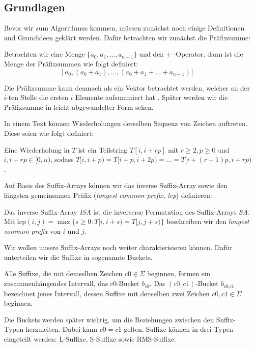 \subsection{Grundlagen}
Bevor wir zum Algorithmus kommen, müssen zunächst noch einige Definitionen und Grundideen geklärt werden. Dafür betrachten wir zunächst die Präfixsumme:

\begin{definition}
	Betrachten wir eine Menge $\{a_0, a_1, \dots , a_{n-1}\}$ und den \glqq + \grqq -Operator, dann ist die Menge der Präfixsummen wie folgt definiert:
	$$
	[a_0, (a_0 + a_1), \dots , (a_0 + a_1 + \dots + a_{n-1})]
	$$
\end{definition}
Die Präfixsumme kann demnach als ein Vektor betrachtet werden, welcher an der $i$-ten Stelle die ersten $i$ Elemente aufsummiert hat \cite{Blelloch90}. Später werden wir die Präfixsumme in leicht abgewandelter Form sehen.

In einem Text können Wiederholungen derselben Sequenz von Zeichen auftreten. Diese seien wie folgt definiert:
\begin{definition}
	\label{repetition}
	Eine Wiederholung in $T$ ist ein Teilstring $T[i, i + rp]$ mit $ r \geq 2, p \geq 0$ und $i, i + rp \in [0, n)$, sodass $T[i, i+p) = T[i + p, i + 2p) = \dots = T[i + (r-1)p, i + rp)$.
\end{definition}


Auf Basis des Suffix-Arrays können wir das inverse Suffix-Array sowie den längsten gemeinsamen Präfix (\textit{longest common prefix, lcp}) definieren:
\begin{definition}
	Das inverse Suffix-Array \textit{ISA} ist die inverserse Permutation des Suffix-Arrays \textit{SA}.
	Mit lcp$(i, j) = \max{ \{s \geq 0: T[i, i+s) =  T[j, j+s) \}}$ beschreiben wir den \textit{longest common prefix} von $i$ und $j$.
\end{definition}

Wir wollen unsere Suffix-Arrays noch weiter charakterisieren können. Dafür unterteilen wir die Suffixe in sogenannte Buckets.

\begin{definition}
	Alle Suffixe, die mit demselben Zeichen $c0 \in \Sigma$ beginnen, formen ein zusammenhängendes Intervall, das $c0$-Bucket $b_{\textit{c0}}$. Das $(c0,c1)$-Bucket $b_{\textit{c0,c1}}$ bezeichnet jenes Intervall, dessen Suffixe mit denselben zwei Zeichen $c0,c1 \in \Sigma$ beginnen.
\end{definition}

Die Buckets werden später wichtig, um die Beziehungen zwischen den Suffix-Typen herzuleiten. Dabei kann $c0=c1$ gelten. Suffixe können in drei Typen eingeteilt werden: L-Suffixe, S-Suffixe sowie RMS-Suffixe.

